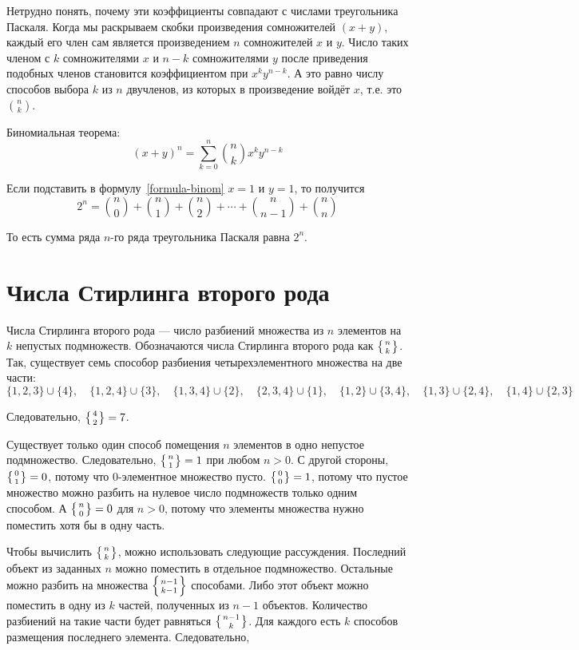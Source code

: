 \documentclass[14pt]{book}
\newcommand{\stirling}[2]{\left\{{#1}\atop{#2}\right\}}
\begin{document}
Нетрудно понять, почему эти коэффициенты совпадают с числами треугольника Паскаля.
Когда мы раскрываем скобки произведения сомножителей $(x+y)$,
каждый его член сам является произведением $n$ сомножителей $x$ и $y$.
Число таких членом с $k$ сомножителями $x$ и $n-k$ сомножителями $y$ после приведения
подобных членов становится коэффициентом при $x^ky^{n-k}$. А это равно числу
способов выбора $k$ из $n$ двучленов, из которых в произведение войдёт $x$,
т.е. это $\binom{n}{k}$.

Биномиальная теорема:
\begin{equation}
\label{formula-binom}
(x+y)^n = \sum_{k=0}^{n}\binom{n}{k}x^ky^{n-k}
\end{equation}

Если подставить в формулу~\ref{formula-binom} $x=1$ и $y=1$, то получится
\begin{equation}
2^n = \binom{n}{0} + \binom{n}{1} + \binom{n}{2} + \cdots + \binom{n}{n-1} + \binom{n}{n}
\end{equation}

То есть сумма ряда $n$-го ряда треугольника Паскаля равна $2^n$.

\section{Числа Стирлинга второго рода}

Числа Стирлинга второго рода --- число разбиений множества из $n$ элементов на $k$
непустых подмножеств. Обозначаются числа Стирлинга второго рода как $\stirling{n}{k}$.
Так, существует семь способор разбиения четырехэлементного множества на две части:
$$
  \{1,2,3\}\cup\{4\}, \quad \{1,2,4\}\cup\{3\}, \quad \{1,3,4\}\cup\{2\}, \quad \{2,3,4\}\cup\{1\},
  \quad \{1,2\}\cup\{3,4\}, \quad \{1,3\}\cup\{2,4\}, \quad \{1,4\}\cup\{2,3\}
$$

Следовательно, $\stirling{4}{2} = 7$.

Существует только один способ помещения $n$ элементов в одно непустое подмножество.
Следовательно, $\stirling{n}{1} = 1$ при любом $n>0$. С другой стороны, $\stirling{0}{1} = 0$,
потому что $0$-элементное множество пусто. $\stirling{0}{0} = 1$, потому что пустое множество
можно разбить на нулевое число подмножеств только одним способом. А $\stirling{n}{0} = 0$ для
$n>0$, потому что элементы множества нужно поместить хотя бы в одну часть.

Чтобы вычислить $\stirling{n}{k}$, можно использовать следующие рассуждения.
Последний объект из заданных $n$ можно поместить в отдельное подмножество. Остальные можно
разбить на множества $\stirling{n-1}{k-1}$ способами. Либо этот объект можно поместить
в одну из $k$ частей, полученных из $n-1$ объектов. Количество разбиений на такие части
будет равняться $\stirling{n-1}{k}$. Для каждого есть $k$ способов размещения последнего
элемента.
Следовательно,
\end{document}
